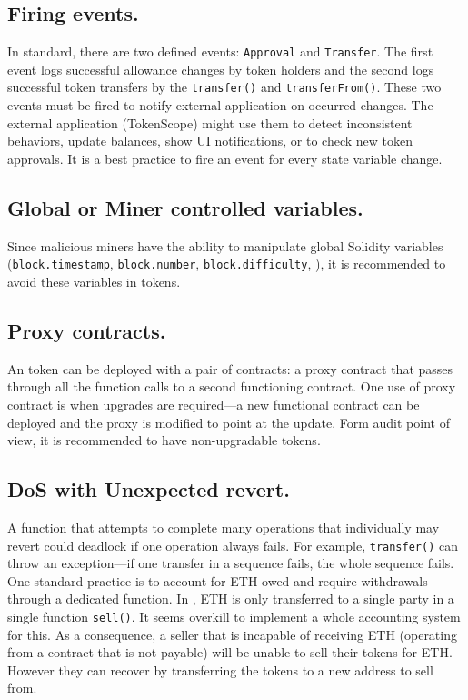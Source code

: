 \subsection{Firing events.}\label{subsec:evnts}
In \erc standard, there are two defined events: \texttt{Approval} and \texttt{Transfer}. The first event logs successful allowance changes by token holders and the second logs successful token transfers by the \texttt{transfer()} and \texttt{transferFrom()}. These two events must be fired to notify external application on occurred changes. The external application (\eg TokenScope\cite{TokenScope}) might use them to detect inconsistent behaviors, update balances, show UI notifications, or to check new token approvals. It is a best practice to fire an event for every state variable change.

\subsection{Global or Miner controlled variables.}\label{subsec:miner}
Since malicious miners have the ability to manipulate global Solidity variables (\eg \texttt{block.timestamp}, \texttt{block.number}, \texttt{block.difficulty}, \etc), it is recommended to avoid these variables in \erc tokens.

\subsection{Proxy contracts.}\label{subsec:prxy}
An \erc token can be deployed with a pair of contracts: a proxy contract that passes through all the function calls to a second functioning \erc contract\cite{ProxyContract,ProxyPatterns}. One use of proxy contract is when upgrades are required---a new functional contract can be deployed and the proxy is modified to point at the update. Form audit point of view, it is recommended to have non-upgradable \erc tokens. 

\subsection{DoS with Unexpected revert.}\label{subsec:rvt}
A function that attempts to complete many operations that individually may revert could deadlock if one operation always fails. For example, \texttt{transfer()} can throw an exception---if one transfer in a sequence fails, the whole sequence fails. One standard practice is to account for ETH owed and require withdrawals through a dedicated function. In \sys, ETH is only transferred to a single party in a single function \texttt{sell()}. It seems overkill to implement a whole accounting system for this. As a consequence, a seller that is incapable of receiving ETH (\eg operating from a contract that is not payable) will be unable to sell their tokens for ETH. However they can recover by transferring the tokens to a new address to sell from. 

